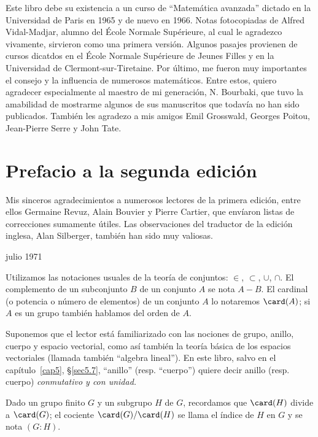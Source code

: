 \documentclass[bibtotoc,leqno,spanish]{amsbook}
\numberwithin{equation}{section}
\theoremstyle{note}
\theoremstyle{note}
\theoremstyle{rem}
\numberwithin{theorem}{section}
\numberwithin{proposition}{section}
\numberwithin{definition}{section}
\numberwithin{lemma}{section}
\numberwithin{corollary}{section}
\numberwithin{example}{section}
\numberwithin{footnote}{section}%
\begin{document}
Este libro debe su existencia a un curso de ``Matem\'atica avanzada''
dictado en la Universidad de Paris en 1965 y de nuevo en 1966.
Notas fotocopiadas de {Alfred Vidal-Madjar,} alumno del \'Ecole
Normale Sup\'erieure, al cual le agradezco vivamente, sirvieron
como una primera versi\'on. Algunos pasajes provienen de cursos dicatdos
en el \'Ecole Normale Sup\'erieure de Jeunes Filles y en la Universidad
de Clermont-sur-Tiretaine. Por \'ultimo, me fueron muy importantes el consejo
y la influencia de numerosos matem\'aticos. Entre estos, quiero agradecer
especialmente al maestro de mi generaci\'on, {N. Bourbaki,} que tuvo la
amabilidad de mostrarme algunos de sus manuscritos que todav\'ia no han sido
publicados. Tambi\'en les agradezo a mis amigos {Emil Grosswald,} {Georges
Poitou,} {Jean-Pierre Serre} y {John Tate.}

\section*{Prefacio a la segunda edici\'on}

Mis sinceros agradecimientos a numerosos lectores de la primera
edici\'on, entre ellos Germaine Revuz, Alain Bouvier y Pierre Cartier,
que env\'iaron listas de correcciones sumamente \'utiles. Las observaciones
del traductor de la edici\'on inglesa, Alan Silberger, tambi\'en han sido
muy valiosas.

\begin{flushright}
julio 1971
\end{flushright}


Utilizamos las notaciones usuales de la teor\'ia de conjuntos:
$\in$, $\subset$, $\cup$, $\cap$.
El complemento de un subconjunto $B$ de un conjunto $A$ se nota $A - B$.
El cardinal (o potencia o n\'umero de elementos) de un conjunto $A$ lo notaremos
$\card(A)$; si $A$ es un grupo tambi\'en hablamos del orden de $A$.

Suponemos que el lector est\'a familiarizado
con las nociones de grupo, anillo, cuerpo y espacio vectorial,
como as\'i tambi\'en la teor\'ia b\'asica de los espacios vectoriales
(llamada tambi\'en ``algebra lineal''). En este libro, salvo en el cap\'itulo~\ref{cap5},
\S\ref{sec5.7}, ``anillo'' (resp. ``cuerpo'') quiere decir anillo (resp. cuerpo)
\emph{conmutativo y con unidad.}

Dado un grupo finito $G$ y un subgrupo $H$ de $G$, recordamos que $\card(H)$ divide
a $\card(G)$; el cociente $\card(G)/\card(H)$ se llama el \'indice de $H$ en $G$ y
se nota $(G:H)$.
\end{document}
